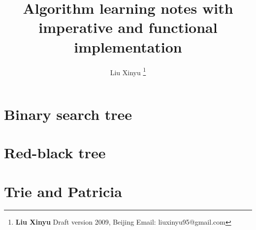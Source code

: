 \documentclass[a4paper,twoside]{book} %
\begin{document}


\title{{\bf \Huge Algorithm} learning notes \newline
            with imperative and functional implementation \newline
            \newline
            }

\author{Liu Xinyu
  \thanks{{\bfseries Liu Xinyu } \newline
    Draft version 2009, Beijing \newline
    Email: liuxinyu95@gmail.com \newline
    }}

\maketitle

%
\tableofcontents
\newpage

\part{Binary search tree}


\part{Red-black tree}


\part{Trie and Patricia}

\end{document}
